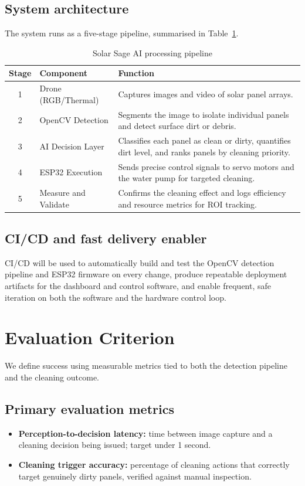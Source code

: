 \documentclass[11pt]{article}
\begin{document}
\subsection{System architecture}
The system runs as a five-stage pipeline, summarised in Table~\ref{tab:pipeline}.

\begin{table}[h]
\centering
\caption{Solar Sage AI processing pipeline}
\label{tab:pipeline}
\begin{tabular}{@{}c l p{8cm}@{}}
\toprule
\textbf{Stage} & \textbf{Component} & \textbf{Function} \\
\midrule
1 & Drone (RGB/Thermal) & Captures images and video of solar panel arrays. \\
2 & OpenCV Detection & Segments the image to isolate individual panels and detect surface dirt or debris. \\
3 & AI Decision Layer & Classifies each panel as clean or dirty, quantifies dirt level, and ranks panels by cleaning priority. \\
4 & ESP32 Execution & Sends precise control signals to servo motors and the water pump for targeted cleaning. \\
5 & Measure and Validate & Confirms the cleaning effect and logs efficiency and resource metrics for ROI tracking. \\
\bottomrule
\end{tabular}
\end{table}

\subsection{CI/CD and fast delivery enabler}
CI/CD will be used to automatically build and test the OpenCV detection pipeline and ESP32 firmware on every change, produce repeatable deployment artifacts for the dashboard and control software, and enable frequent, safe iteration on both the software and the hardware control loop.

\section{Evaluation Criterion}
We define success using measurable metrics tied to both the detection pipeline and the cleaning outcome.

\subsection{Primary evaluation metrics}
\begin{itemize}
    \item \textbf{Perception-to-decision latency:} time between image capture and a cleaning decision being issued; target under 1 second.
    \item \textbf{Cleaning trigger accuracy:} percentage of cleaning actions that correctly target genuinely dirty panels, verified against manual inspection.
\end{itemize}
\end{document}
